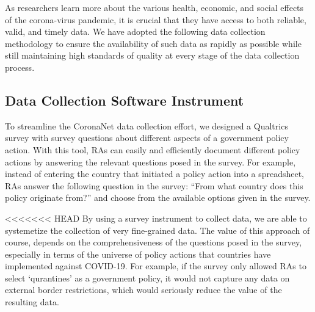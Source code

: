 \documentclass[]{article}
\begin{document}
As researchers learn more about the various health, economic, and social effects of the corona-virus pandemic, it is crucial that they have access to both reliable, valid, and timely data. We have adopted the following data collection methodology to ensure the availability of such data as rapidly as possible while still maintaining high standards of quality at every stage of the data collection process.

\hypertarget{data-collection-software-instrument}{%
\subsection{Data Collection Software Instrument}\label{data-collection-software-instrument}}

To streamline the CoronaNet data collection effort, we designed a Qualtrics survey with survey questions about different aspects of a government policy action. With this tool, RAs can easily and efficiently document different policy actions by answering the relevant questions posed in the survey. For example, instead of entering the country that initiated a policy action into a spreadsheet, RAs answer the following question in the survey: ``From what country does this policy originate from?'' and choose from the available options given in the survey.

<<<<<<< HEAD
By using a survey instrument to collect data, we are able to systemetize the collection of very fine-grained data. The value of this approach of course, depends on the comprehensiveness of the questions posed in the survey, especially in terms of the universe of policy actions that countries have implemented against COVID-19. For example, if the survey only allowed RAs to select `qurantines' as a government policy, it would not capture any data on external border restrictions, which would seriously reduce the value of the resulting data.
\end{document}
